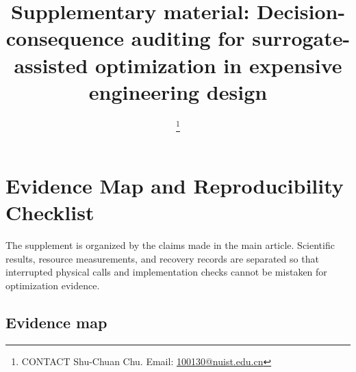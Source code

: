 \documentclass[suppldata]{interact}
\begin{document}
\title{Supplementary material: Decision-consequence auditing for surrogate-assisted optimization in expensive engineering design}
\author{
\thanks{CONTACT Shu-Chuan Chu. Email: \href{mailto:100130@nuist.edu.cn}{100130@nuist.edu.cn}}
}
\maketitle
\setcounter{section}{-1}\renewcommand{}\renewcommand{}\renewcommand{}

\hypertarget{evidence-map-and-reproducibility-checklist}{%
\section{Evidence Map and Reproducibility Checklist}\label{evidence-map-and-reproducibility-checklist}}

The supplement is organized by the claims made in the main article. Scientific results, resource measurements, and recovery records are separated so that interrupted physical calls and implementation checks cannot be mistaken for optimization evidence.

\hypertarget{evidence-map}{%
\subsection{Evidence map}\label{evidence-map}}
\end{document}
